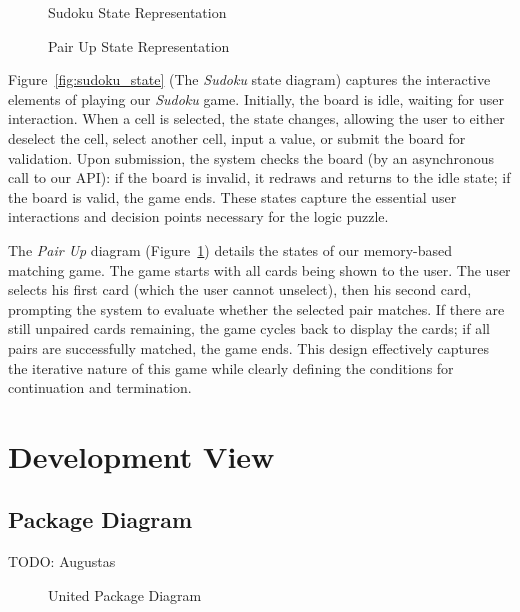 \documentclass[11pt,a4paper]{article}
\newcommand{\inputdiagram}[1]{}
\newcommand{\textwidthdiagram}[2][1]{%
  \resizebox{#1\textwidth}{!}{\inputdiagram{#2}}%
}
\begin{document}
\begin{figure}[H]
    \centering
    \begin{minipage}[b]{0.48\textwidth}
        \centering
        \textwidthdiagram{sudoku_state.tex}
        \caption{Sudoku State Representation}
        \label{fig:sudoku_state}
    \end{minipage}
    \hfil
    \begin{minipage}[b]{0.48\textwidth}
        \centering
        \textwidthdiagram{pair_up_state.tex}
        \caption{Pair Up State Representation}
        \label{fig:pair_up_state}
    \end{minipage}
\end{figure}

Figure~\ref{fig:sudoku_state} (The \textit{Sudoku} state diagram) captures
the interactive elements of playing our \textit{Sudoku} game. Initially, the board
is idle, waiting for user interaction. When a cell is selected, the state
changes, allowing the user to either deselect the cell, select another
cell, input a value, or submit the board for validation. Upon submission,
the system checks the board (by an asynchronous call to our API): if the
board is invalid, it redraws and returns to the idle state; if the board
is valid, the game ends. These states capture the essential user interactions
and decision points necessary for the logic puzzle.

The \textit{Pair Up} diagram (Figure~\ref{fig:pair_up_state}) details the
states of our memory-based matching game. The game starts with all cards being
shown to the user. The user selects his first card (which the user cannot
unselect), then his second card, prompting the system to evaluate whether the
selected pair matches. If there are still unpaired cards remaining, the game cycles
back to display the cards; if all pairs are successfully matched,
the game ends. This design effectively captures the iterative nature of this
game while clearly defining the conditions for continuation and termination.








\section{Development View}

\subsection{Package Diagram}
TODO: Augustas
\begin{figure}[H]
    \centering
    \textwidthdiagram{united_package.latex}
    \caption{United Package Diagram}
    \label{fig:united_package}
\end{figure}
\end{document}

